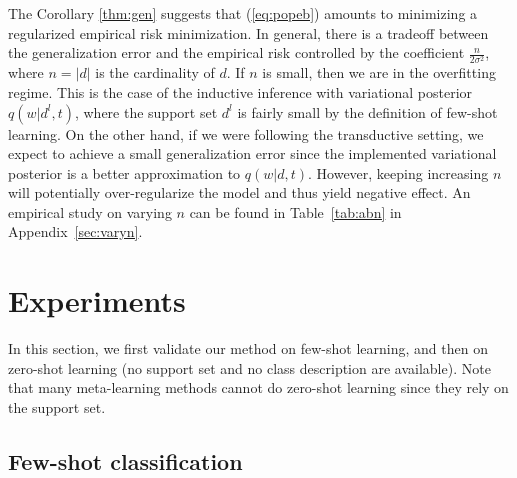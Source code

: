 \documentclass{article} \usepackage{iclr2020_conference,times}
\def\eqref#1{(\ref{#1})}
\begin{document}
The Corollary \ref{thm:gen} suggests that \eqref{eq:popeb} amounts to minimizing a regularized empirical risk minimization.
In general, there is a tradeoff between the generalization error and the empirical risk 
controlled by the coefficient $\frac{n}{2 \sigma^2}$, where $n = |d|$ is the cardinality of $d$.
If $n$ is small, then we are in the overfitting regime. 
This is the case of the inductive inference with variational posterior $q(w | d^l, t)$, 
where the support set $d^l$ is fairly small by the definition of few-shot learning.
On the other hand, if we were following the transductive setting, we expect to achieve a small generalization error since the implemented variational posterior is a better approximation to $q(w | d, t)$.
However, keeping increasing $n$ will potentially over-regularize the model and thus yield negative effect.
An empirical study on varying $n$ can be found in Table~\ref{tab:abn} in Appendix~\ref{sec:varyn}.


 \section{Experiments}
\label{sec:exp}
In this section, we first validate our method on few-shot learning, 
and then on zero-shot learning (no support set and no class description are available). 
Note that many meta-learning methods cannot do zero-shot learning since they rely on the support set.

\subsection{Few-shot classification}
\label{sec:few}
\end{document}
